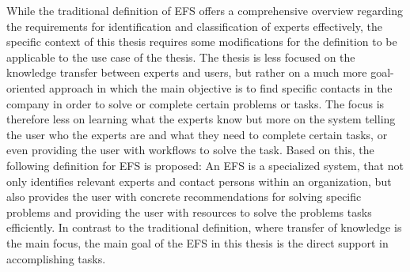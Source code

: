 While the traditional definition of \ac{EFS} offers a comprehensive overview regarding the requirements for identification and classification of experts effectively, the specific context of this thesis requires some modifications for the definition to be applicable to the use case of the thesis. The thesis is less focused on the knowledge transfer between experts and users, but rather on a much more goal-oriented approach in which the main objective is to find specific contacts in the company in order to solve or complete certain problems or tasks. The focus is therefore less on learning what the experts know but more on the system telling the user who the experts are and what they need to complete certain tasks, or even providing the user with workflows to solve the task. Based on this, the following definition for \ac{EFS} is proposed: An \ac{EFS} is a specialized system, that not only identifies relevant experts and contact persons within an organization, but also provides the user with concrete recommendations for solving specific problems and providing the user with resources to solve the problems tasks efficiently. In contrast to the traditional definition, where transfer of knowledge is the main focus, the main goal of the \ac{EFS} in this thesis is the direct support in accomplishing tasks.

